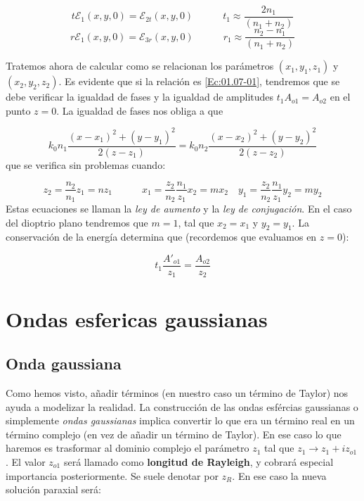 \documentclass[12pt,a4paper]{book}
\numberwithin{equation}{section}
\numberwithin{figure}{section}
\newcommand{\tquad}{\quad \quad \quad}
\newcommand{\1}{_{(1)}}
\newcommand{\2}{_{(2)}}
\theoremstyle{definition}
\begin{document}
\begin{equation}
t \mathcal{E}_1 (x,y,0) = \mathcal{E}_{2t} (x,y,0) \tquad t_1 \approx \dfrac{2 n_1}{(n_1 + n_2)} \label{Ec:01.07-01}
\end{equation}
\begin{equation}
r \mathcal{E}_1 (x,y,0) = \mathcal{E}_{3r} (x,y,0) \tquad r_1 \approx \dfrac{n_2-n_1}{(n_1 + n_2)} 
\end{equation}

Tratemos ahora de calcular como se relacionan los parámetros $(x_1,y_1,z_1)$ y $(x_2,y_2,z_2)$. Es evidente que si la relación es \ref{Ec:01.07-01}, tendremos que se debe verificar la igualdad de fases y la igualdad de amplitudes $t_1 A_{o1} = A_{o2}$ en el punto $z=0$. La igualdad de fases nos obliga a que 

$$ k_0 n_1 \frac{(x-x_1)^2+(y-y_1)^2}{2 (z-z_1)} = k_0 n_2 \frac{(x-x_2)^2 + (y-y_2)^2}{2 (z-z_2)} $$
que se verifica sin problemas cuando:

\begin{equation}
z_2 = \frac{n_2}{n_1} z_1 = n z_1 \tquad x_1 =  \frac{z_2}{n_2} \frac{n_1}{z_1} x_2 = m  x_2 \quad y_1 =  \frac{z_2}{n_2} \frac{n_1}{z_1} y_2 = m  y_2
\end{equation} 
Estas ecuaciones se llaman la \textit{ley de aumento} y la \textit{ley de conjugación}. En el caso del dioptrio plano tendremos que $m=1$, tal que $x_2 = x_1$ y $y_2 = y_1$. La conservación de la energía determina que (recordemos que evaluamos en $z=0$):

\begin{equation}
t_1 \frac{A'_{o1}}{z_1} =  \frac{A_{o2}}{z_2}
\end{equation}


\section{Ondas esfericas gaussianas}

\subsection{Onda gaussiana}

Como hemos visto, añadir términos (en nuestro caso un término de Taylor) nos ayuda a modelizar la realidad. La construcción de las ondas esfércias gaussianas o simplemente \textit{ondas gaussianas} implica convertir lo que era un término real en un término complejo (en vez de añadir un término de Taylor). En ese caso lo que haremos es trasformar al dominio complejo el parámetro $z_1$ tal que $z_1 \rightarrow z_1 + i z_{o1}$. El valor $z_{o1}$ será llamado como \textbf{longitud de Rayleigh}, y cobrará especial importancia posteriormente. Se suele denotar por $z_R$. En ese caso la nueva solución paraxial será:
\end{document}
